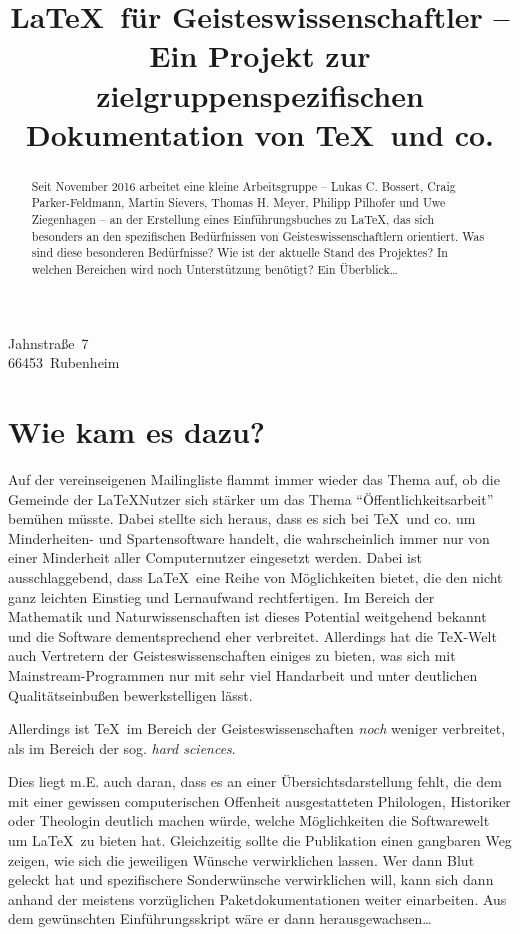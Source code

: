 \documentclass[ngerman]{dtk}
\begin{document}
	
	
\title{\LaTeX\ für Geisteswissenschaftler -- 
    Ein Projekt zur zielgruppenspezifischen Dokumentation von \TeX\ und co.}
%
	{Jahnstraße~7\\
	66453~Rubenheim\\
	}
\maketitle


\begin{abstract}
Seit November 2016 arbeitet eine kleine Arbeitsgruppe 
-- Lukas C. Bossert, Craig Parker-Feldmann, Martin Sievers, Thomas H. Meyer, Philipp Pilhofer und Uwe Ziegenhagen --
an der Erstellung eines Einführungsbuches zu \LaTeX ,
das sich besonders an den spezifischen Bedürfnissen von Geisteswissenschaftlern orientiert.
Was sind diese besonderen Bedürfnisse?
Wie ist der aktuelle Stand des Projektes?
In welchen Bereichen wird noch Unterstützung benötigt?
Ein Überblick\ldots 
\end{abstract}

\section{Wie kam es dazu?}

Auf der vereinseigenen Mailingliste flammt immer wieder das Thema auf, ob die Gemeinde der \LaTeX\-Nutzer
sich stärker um das Thema \enquote{Öffentlichkeitsarbeit} bemühen müsste.
Dabei stellte sich heraus, dass es sich bei \TeX\ und co. um Minderheiten- und Spartensoftware handelt, die
wahrscheinlich immer nur von einer Minderheit aller Computernutzer eingesetzt werden.
Dabei ist ausschlaggebend, dass \LaTeX\ eine Reihe von Möglichkeiten bietet, die den nicht ganz leichten Einstieg
und Lernaufwand rechtfertigen. 
Im Bereich der Mathematik und Naturwissenschaften ist dieses Potential weitgehend bekannt und die Software
dementsprechend eher verbreitet.
Allerdings hat die \TeX -Welt auch Vertretern der Geisteswissenschaften einiges zu bieten, was sich mit 
Mainstream-Programmen nur mit sehr viel Handarbeit und unter deutlichen Qualitätseinbußen bewerkstelligen lässt.

Allerdings ist \TeX\ im Bereich der Geisteswissenschaften \emph{noch} weniger verbreitet, als im Bereich der
sog. \emph{hard sciences}.

Dies liegt m.E. auch daran, dass es an einer Übersichtsdarstellung fehlt, die dem mit einer gewissen 
computerischen Offenheit ausgestatteten Philologen, Historiker oder Theologin deutlich machen würde,
welche Möglichkeiten die Softwarewelt um \LaTeX\ zu bieten hat. 
Gleichzeitig sollte die Publikation einen gangbaren Weg zeigen, wie sich die jeweiligen Wünsche verwirklichen
lassen. Wer dann Blut geleckt hat und spezifischere Sonderwünsche verwirklichen will, kann sich dann anhand
der meistens vorzüglichen Paketdokumentationen weiter einarbeiten. 
Aus dem gewünschten Einführungsskript wäre er dann herausgewachsen\ldots 
\end{document}
